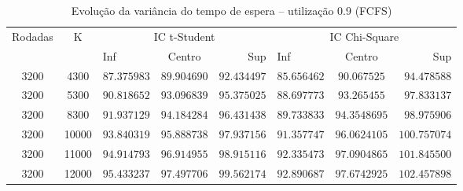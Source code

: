 \documentclass[a4paper]{article}
\begin{document}
\begin{table}[h!]
    \centering
    \begin{tabular}{|c|c|lcr|lcr|}\hline
        \multirow{2}{3.75em}{Rodadas}
            & \multirow{2}{1em}{K}
            & \multicolumn{3}{|c|}{IC t-Student}
            & \multicolumn{3}{|c|}{IC Chi-Square} \\
        && Inf & Centro & Sup & Inf & Centro & Sup \\\hline
        3200 & 4300
            &$ 87.375983 $&$ 89.904690 $&$ 92.434497 $
            &$ 85.656462 $&$ 90.067525 $&$ 94.478588 $\\\hline
        3200 & 5300
            &$ 90.818652 $&$ 93.096839 $&$ 95.375025 $
            &$ 88.697773 $&$ 93.265455 $&$ 97.833137 $\\\hline
        3200 & 8300
            &$ 91.937129 $&$ 94.184284 $&$ 96.431438 $
            &$ 89.733833 $&$ 94.3548695 $&$ 98.975906 $\\\hline
        3200 & 10000
            &$ 93.840319 $&$ 95.888738 $&$ 97.937156 $
            &$ 91.357747 $&$ 96.0624105 $&$ 100.757074 $\\\hline
        3200 & 11000
            &$ 94.914793 $&$ 96.914955 $&$ 98.915116 $
            &$ 92.335473 $&$ 97.0904865 $&$ 101.845500 $\\\hline
        3200 & 12000
            &$ 95.433237 $&$ 97.497706 $&$ 99.562174 $
            &$ 92.890687 $&$ 97.6742925 $&$ 102.457898 $\\\hline
    \end{tabular}
    \caption{Evolução da variância do tempo de espera --
        utilização 0.9 (FCFS)}
\end{table}
\end{document}
